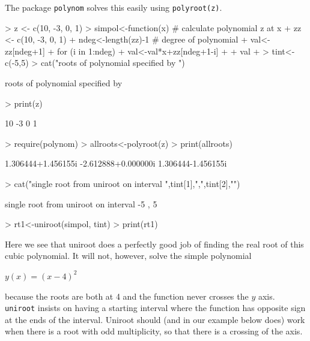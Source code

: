 \documentclass[11pt,letterpaper]{article}
\begin{document}
The package \texttt{polynom} solves this easily using \texttt{polyroot(z)}.

\begin{Schunk}
\begin{Sinput}
> z <- c(10, -3, 0, 1)
> simpol<-function(x){ # calculate polynomial z at x 
+    zz <- c(10, -3, 0, 1)
+    ndeg<-length(zz)-1 # degree of polynomial
+    val<-zz[ndeg+1]
+    for (i in 1:ndeg){
+        val<-val*x+zz[ndeg+1-i]
+    }
+    val
+ }
> tint<-c(-5,5)
> cat("roots of polynomial specified by ")
\end{Sinput}
\begin{Soutput}
roots of polynomial specified by 
\end{Soutput}
\begin{Sinput}
> print(z)
\end{Sinput}
\begin{Soutput}
[1] 10 -3  0  1
\end{Soutput}
\begin{Sinput}
> require(polynom)
> allroots<-polyroot(z)
> print(allroots)
\end{Sinput}
\begin{Soutput}
[1]  1.306444+1.456155i -2.612888+0.000000i  1.306444-1.456155i
\end{Soutput}
\begin{Sinput}
> cat("single root from uniroot on interval ",tint[1],",",tint[2],"\n")
\end{Sinput}
\begin{Soutput}
single root from uniroot on interval  -5 , 5 
\end{Soutput}
\begin{Sinput}
> rt1<-uniroot(simpol, tint)
> print(rt1)
\end{Sinput}
\end{Schunk}

Here we see that uniroot does a perfectly good job of finding the real root
of this cubic polynomial. It will not, however, solve the simple polynomial

$ y(x) = (x-4)^2 $

because the roots are both at 4 and the function never crosses the $y$ axis. 
\texttt{uniroot} insists on having a starting interval where the function has
opposite sign at the ends of the interval. Uniroot should (and in our example
below does) work when there is a root with odd multiplicity, so that there is
a crossing of the axis.
\end{document}
